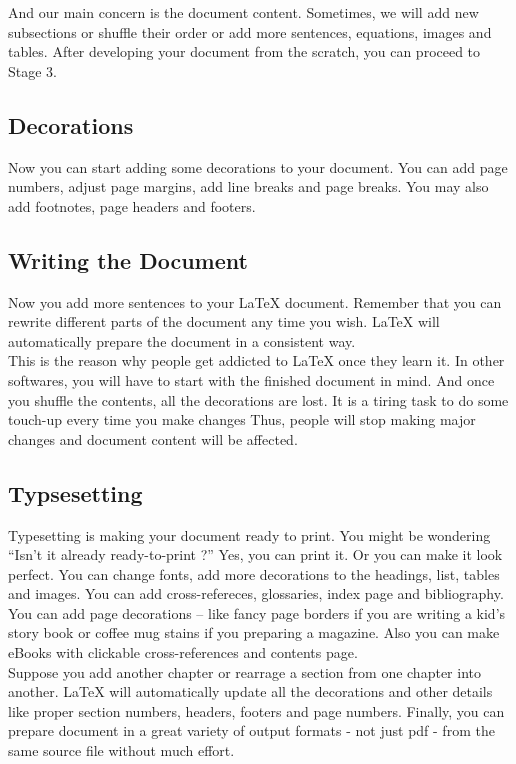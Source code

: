 \documentclass{article}
\begin{document}
And our main concern is the document content. Sometimes, we will add new subsections or shuffle their order or add more sentences, equations, images and tables. After developing your document from the scratch, you can proceed to Stage 3.

\subsection{Decorations}
Now you can start adding some decorations to your document. You can add page numbers, adjust page margins, add line breaks and page breaks. You may also add footnotes, page headers and footers.

\subsection{Writing the Document}
Now you add more sentences to your LaTeX document. Remember that you can rewrite different parts of the  document any time you wish. LaTeX will automatically prepare the document in a consistent way.\\
	
This is the reason why people get addicted to LaTeX once they learn it. In other softwares, you will have to start with the finished document in mind. And once you shuffle the contents, all the decorations are lost. It is a tiring task to do some touch-up every time you make changes Thus, people will stop making major changes and document content will be affected.

\subsection{Typsesetting}
Typesetting is making your document ready to print. You might be wondering ``Isn't it already ready-to-print ?'' Yes, you can print it. Or you can make it look perfect. You can change fonts, add more decorations to the headings, list, tables and images. You can add cross-refereces, glossaries, index page and bibliography. You can add page decorations -- like fancy page borders if you are writing a kid's story book or coffee mug stains if you preparing a magazine. Also you can make eBooks with clickable cross-references and contents page.\\

Suppose you add another chapter or rearrage a section from one chapter into another. LaTeX will automatically update all the decorations and other details like proper section numbers, headers, footers and page numbers. Finally, you can prepare document in a great variety of output formats - not just pdf - from the same source file without much effort.
\end{document}
